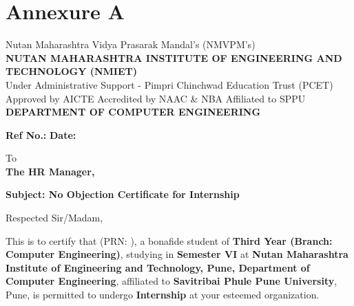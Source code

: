 \documentclass[12pt, a4paper, oneside]{report}
\begin{document}
\appendix
\chapter*{Annexure A}
\thispagestyle{fancy}

\begin{center}
    {\small Nutan Maharashtra Vidya Prasarak Mandal's (NMVPM's)}\\[0.2cm]
    {\large \textbf{NUTAN MAHARASHTRA INSTITUTE OF ENGINEERING AND TECHNOLOGY (NMIET)}}\\
    {\small Under Administrative Support - Pimpri Chinchwad Education Trust (PCET)}\\[0.2cm]
    {\small Approved by AICTE \quad Accredited by NAAC \& NBA \quad Affiliated to SPPU}\\[0.2cm]
    {\large \textbf{DEPARTMENT OF COMPUTER ENGINEERING}}\\
\end{center}

\vspace{0.3cm}
\noindent \textbf{Ref No.:} \hfill \textbf{Date:}

\vspace{0.3cm}
\noindent To\\
\textbf{The HR Manager,}

\vspace{0.3cm}
\noindent \textbf{Subject: No Objection Certificate for Internship}

\vspace{0.2cm}
\noindent Respected Sir/Madam,

\vspace{0.2cm}
\noindent This is to certify that \underline{\hspace{3cm}} (PRN: \underline{\hspace{2cm}}), a bonafide student of \textbf{Third Year (Branch: Computer Engineering)}, studying in \textbf{Semester VI} at \textbf{Nutan Maharashtra Institute of Engineering and Technology, Pune, Department of Computer Engineering}, affiliated to \textbf{Savitribai Phule Pune University}, Pune, is permitted to undergo \textbf{Internship} at your esteemed organization.
\end{document}
